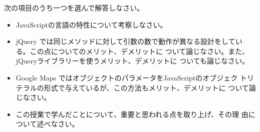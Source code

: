 \documentclass[a4j,12pt]{jreport}
\begin{document}
\begin{Prob}\label{lastProb}
 \upshape
 次の項目のうち一つを選んで解答しなさい。
 \begin{itemize}
  \item JavaScriptの言語の特性について考察しなさい。
  \item jQuery では同じメソッドに対して引数の数で動作が異なる設計をしてい
	る。この点についてのメリット、デメリットに
	ついて論じなさい。また、jQueryライブラリーを使うメリット、デメリットに
	ついても論じなさい。
  \item Google Maps ではオブジェクトのパラメータをJavaScriptのオブジェク
	トリテラルの形式で与えているが、この方法もメリット、デメリットに
	ついて論じなさい。
  \item この授業で学んだことについて、重要と思われる点を取り上げ、その理
	由について述べなさい。
 \end{itemize}
 
\end{Prob}
\label{lastPage}
\end{document}
